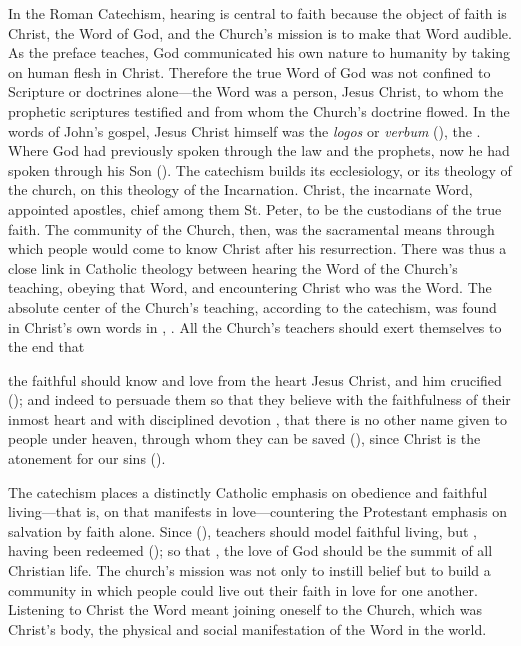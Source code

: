 In the Roman Catechism, hearing is central to faith because the object of faith
is Christ, the Word of God, and the Church's mission is to make that Word
audible.
As the preface teaches, God communicated his own nature to humanity by taking on
human flesh in Christ.
Therefore the true Word of God was not confined to Scripture or doctrines
alone---the Word was a person, Jesus Christ, to whom the prophetic scriptures
testified and from whom the Church's doctrine flowed.%
    \Autocite[9]{Catholic:Catechismus1614}
In the words of John's gospel, Jesus Christ himself was the \emph{logos} or
\emph{verbum} (), the .
Where God had previously spoken through the law and the prophets, now he had
spoken through his Son ().
The catechism builds its ecclesiology, or its theology of the church, on this
theology of the Incarnation.
Christ, the incarnate Word, appointed apostles, chief among them St. Peter, to
be the custodians of the true faith.
The community of the Church, then, was the sacramental means through which
people would come to know Christ after his resurrection.
There was thus a close link in Catholic theology between hearing the Word of the
Church's teaching, obeying that Word, and encountering Christ who was the Word.
The absolute center of the Church's teaching, according to the catechism, was
found in Christ's own words in , .%
    \Autocite[6]{Catholic:Catechismus1614}
All the Church's teachers should exert themselves to the end that
\begin{quoting}
    the faithful should know and love from the heart Jesus Christ, and him
    crucified (); and indeed to persuade them so that they
    believe with the faithfulness  of their inmost heart and
    with disciplined devotion , that there is no other name
    given to people under heaven, through whom they can be saved
    (), since Christ is the atonement for our sins
    ().%
        \Autocite
        [6 (scriptural citations in marginal notes)]
        {Catholic:Catechismus1614}
\end{quoting}
The catechism places a distinctly Catholic emphasis on obedience and faithful
living---that is, on  that manifests in love---countering
the Protestant emphasis on salvation by faith alone.
Since 
(), teachers should model faithful living,  but , having been redeemed  (); so that , the love of God should be the summit of all Christian life.%
    \Autocite[6--7]{Catholic:Catechismus1614}
The church's mission was not only to instill belief but to build a community in
which people could live out their faith in love for one another.
Listening to Christ the Word meant joining oneself to the Church, which was
Christ's body, the physical and social manifestation of the Word in the world.

